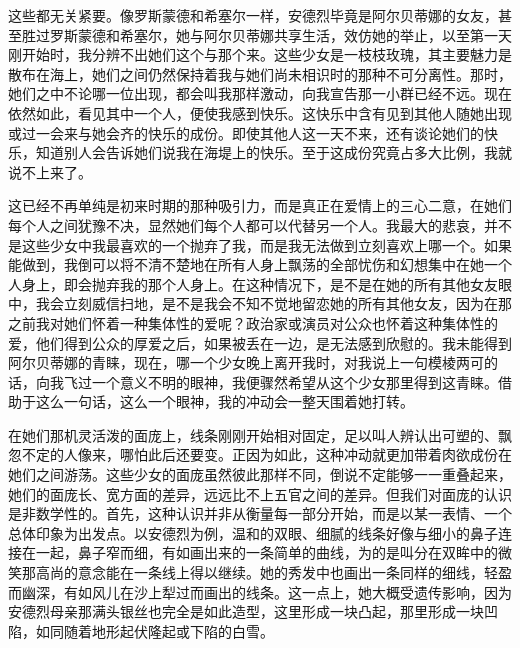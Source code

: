 \par 这些都无关紧要。像罗斯蒙德和希塞尔一样，安德烈毕竟是阿尔贝蒂娜的女友，甚至胜过罗斯蒙德和希塞尔，她与阿尔贝蒂娜共享生活，效仿她的举止，以至第一天刚开始时，我分辨不出她们这个与那个来。这些少女是一枝枝玫瑰，其主要魅力是散布在海上，她们之间仍然保持着我与她们尚未相识时的那种不可分离性。那时，她们之中不论哪一位出现，都会叫我那样激动，向我宣告那一小群已经不远。现在依然如此，看见其中一个人，便使我感到快乐。这快乐中含有见到其他人随她出现或过一会来与她会齐的快乐的成份。即使其他人这一天不来，还有谈论她们的快乐，知道别人会告诉她们说我在海堤上的快乐。至于这成份究竟占多大比例，我就说不上来了。
\par 这已经不再单纯是初来时期的那种吸引力，而是真正在爱情上的三心二意，在她们每个人之间犹豫不决，显然她们每个人都可以代替另一个人。我最大的悲哀，并不是这些少女中我最喜欢的一个抛弃了我，而是我无法做到立刻喜欢上哪一个。如果能做到，我倒可以将不清不楚地在所有人身上飘荡的全部忧伤和幻想集中在她一个人身上，即会抛弃我的那个人身上。在这种情况下，是不是在她的所有其他女友眼中，我会立刻威信扫地，是不是我会不知不觉地留恋她的所有其他女友，因为在那之前我对她们怀着一种集体性的爱呢？政治家或演员对公众也怀着这种集体性的爱，他们得到公众的厚爱之后，如果被丢在一边，是无法感到欣慰的。我未能得到阿尔贝蒂娜的青睐，现在，哪一个少女晚上离开我时，对我说上一句模棱两可的话，向我飞过一个意义不明的眼神，我便骤然希望从这个少女那里得到这青睐。借助于这么一句话，这么一个眼神，我的冲动会一整天围着她打转。
\par 在她们那机灵活泼的面庞上，线条刚刚开始相对固定，足以叫人辨认出可塑的、飘忽不定的人像来，哪怕此后还要变。正因为如此，这种冲动就更加带着肉欲成份在她们之间游荡。这些少女的面庞虽然彼此那样不同，倒说不定能够一一重叠起来，她们的面庞长、宽方面的差异，远远比不上五官之间的差异。但我们对面庞的认识是非数学性的。首先，这种认识并非从衡量每一部分开始，而是以某一表情、一个总体印象为出发点。以安德烈为例，温和的双眼、细腻的线条好像与细小的鼻子连接在一起，鼻子窄而细，有如画出来的一条简单的曲线，为的是叫分在双眸中的微笑那高尚的意念能在一条线上得以继续。她的秀发中也画出一条同样的细线，轻盈而幽深，有如风儿在沙上犁过而画出的线条。这一点上，她大概受遗传影响，因为安德烈母亲那满头银丝也完全是如此造型，这里形成一块凸起，那里形成一块凹陷，如同随着地形起伏隆起或下陷的白雪。
